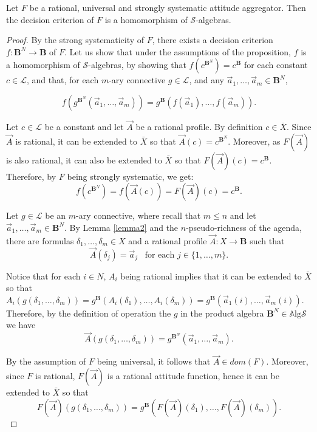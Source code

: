 \documentclass{llncs}
\numberwithin{equation}{section}
\newcommand{\Sm}{\mathcal{S}}   \newcommand{\Lm}{\mathcal{L}}  \newcommand{\Fm}{\mathbf{Fm}}  \newcommand{\Hom}{\mathrm{Hom}}   \newcommand{\Al}{\mathbf{A}}  \newcommand{\BB}{\mathbf{B}}   \newcommand{\Alg}{\mathbb{A}\mathrm{lg}}
\newcommand{\SSS}{\mathcal{S}}
\begin{document}
\begin{proposition}\label{prop1}
Let $F$ be a rational, universal and strongly systematic attitude aggregator. Then the decision criterion of $F$ is a homomorphism of $\SSS$-algebras.
\end{proposition}
\begin{proof}

By the strong systematicity of $F$, there exists a decision criterion $f:\BB^{N}\longrightarrow \BB$ of $F$. Let us show that under the assumptions of the proposition, $f$ is a homomorphism of $\SSS$-algebras, by showing that $f(c^{\BB^{N}})=c^{\BB}$ for each constant $c\in\Lm$, and that, for each $m$-ary connective $g\in\Lm$, and any $\vec{a}_{1},\dots,\vec{a}_{m}\in \BB^{N}$,

$$f(g^{\BB^{N}}(\vec{a}_{1},\dots,\vec{a}_{m}))=g^{\BB}(f(\vec{a}_{1}),\dots,f(\vec{a}_{m})).$$

Let $c\in \Lm$ be a constant and let $\vec{A}$ be a rational profile. By definition $c\in \bar{X}$.
Since $\vec{A}$ is rational, it can be extended to $\bar{X}$ so that $\vec{A}(c)=c^{\BB^{N}}$.
Moreover, as $F(\vec{A})$ is also rational, it can also be extended to $\bar{X}$ so that $F(\vec{A})(c)=c^{\BB}$.
Therefore, by $F$ being strongly systematic, we get:
$$f(c^{\BB^{N}})=f(\vec{A}(c))=F(\vec{A})(c)=c^{\BB}.$$

Let $g\in\Lm$ be an $m$-ary connective, where recall that $m\leq n$ and  let $\vec{a}_{1},\dots,\vec{a}_{m}\in \BB^{N}$.
By Lemma \ref{lemma2} and the $n$-pseudo-richness of the agenda, there are formulas $\delta_{1},\dots,\delta_{m}\in X$ and a rational profile $\vec{A}:X\longrightarrow \BB$ such that
\begin{equation}\label{equ:1}
\vec{A}(\delta_{j})=\vec{a}_{j} \,\,\, \text{ for each } j\in\{1,\dots,m\}.
\end{equation}

Notice that for each $i\in N$, $A_{i}$ being rational implies that it can be extended to $\bar{X}$ so that $A_{i}(g(\delta_{1},\dots,\delta_{m}))=g^{\BB}(A_{i}(\delta_{1}),\dots,A_{i}(\delta_{m}))=g^{\BB}(\vec{a}_{1}(i),\dots,\vec{a}_{m}(i))$.
Therefore, by the definition of operation the $g$ in the product algebra $\BB^{N}\in\Alg\Sm$ we have
\begin{equation}\label{equ:2}
\vec{A}(g(\delta_{1},\dots,\delta_{m}))=g^{\BB^{N}}(\vec{a}_{1},\dots,\vec{a}_{m}).
\end{equation}

By the assumption of $F$ being universal, it follows that $\vec{A}\in dom(F)$. Moreover, since $F$ is rational, $F(\vec{A})$ is a rational attitude function, hence it can be extended to $\bar{X}$ so that
\begin{equation}\label{equ:3}
F(\vec{A})(g(\delta_{1},\dots,\delta_{m}))=g^{\BB}(F(\vec{A})(\delta_{1}),\dots,F(\vec{A})(\delta_{m})).
\end{equation}


\end{proof}
\end{document}
